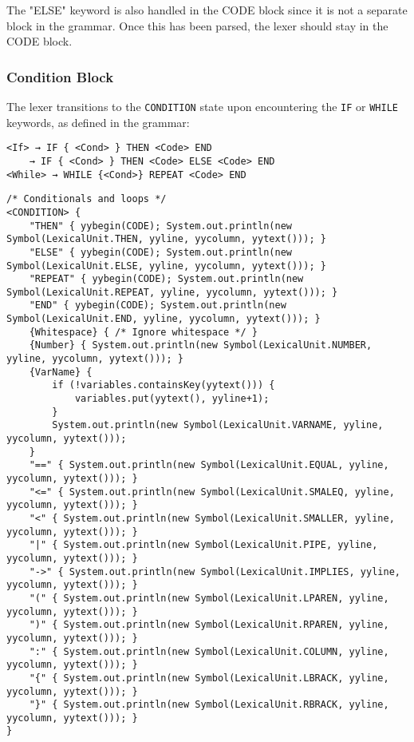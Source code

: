 	The "ELSE" keyword is also handled in the CODE block since it is not a separate block in the grammar. Once this has been parsed, the lexer should stay in the CODE block.\\


	\subsubsection{Condition Block}
	The lexer transitions to the \texttt{CONDITION} state upon encountering the \texttt{IF} or \texttt{WHILE} keywords, as defined in the grammar:

	\begin{verbatim}
<If> → IF { <Cond> } THEN <Code> END
    → IF { <Cond> } THEN <Code> ELSE <Code> END
<While> → WHILE {<Cond>} REPEAT <Code> END
	\end{verbatim}

	\begin{verbatim}
/* Conditionals and loops */
<CONDITION> {
    "THEN" { yybegin(CODE); System.out.println(new Symbol(LexicalUnit.THEN, yyline, yycolumn, yytext())); }
    "ELSE" { yybegin(CODE); System.out.println(new Symbol(LexicalUnit.ELSE, yyline, yycolumn, yytext())); }
    "REPEAT" { yybegin(CODE); System.out.println(new Symbol(LexicalUnit.REPEAT, yyline, yycolumn, yytext())); }
    "END" { yybegin(CODE); System.out.println(new Symbol(LexicalUnit.END, yyline, yycolumn, yytext())); }
    {Whitespace} { /* Ignore whitespace */ }
    {Number} { System.out.println(new Symbol(LexicalUnit.NUMBER, yyline, yycolumn, yytext())); }
    {VarName} {
        if (!variables.containsKey(yytext())) {
            variables.put(yytext(), yyline+1);
        }
        System.out.println(new Symbol(LexicalUnit.VARNAME, yyline, yycolumn, yytext()));
    }
    "==" { System.out.println(new Symbol(LexicalUnit.EQUAL, yyline, yycolumn, yytext())); }
    "<=" { System.out.println(new Symbol(LexicalUnit.SMALEQ, yyline, yycolumn, yytext())); }
    "<" { System.out.println(new Symbol(LexicalUnit.SMALLER, yyline, yycolumn, yytext())); }
    "|" { System.out.println(new Symbol(LexicalUnit.PIPE, yyline, yycolumn, yytext())); }
    "->" { System.out.println(new Symbol(LexicalUnit.IMPLIES, yyline, yycolumn, yytext())); }
    "(" { System.out.println(new Symbol(LexicalUnit.LPAREN, yyline, yycolumn, yytext())); }
    ")" { System.out.println(new Symbol(LexicalUnit.RPAREN, yyline, yycolumn, yytext())); }
    ":" { System.out.println(new Symbol(LexicalUnit.COLUMN, yyline, yycolumn, yytext())); }
    "{" { System.out.println(new Symbol(LexicalUnit.LBRACK, yyline, yycolumn, yytext())); }
    "}" { System.out.println(new Symbol(LexicalUnit.RBRACK, yyline, yycolumn, yytext())); }
}
	\end{verbatim}

